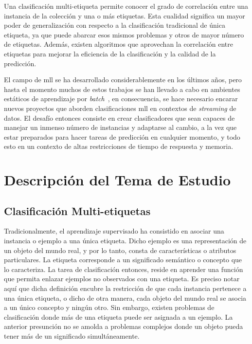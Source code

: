 Una clasificación multi-etiqueta permite conocer el grado de correlación entre
una instancia de la colección y una o más etiquetas. Esta cualidad significa un
mayor poder de generalización con respecto a la clasificación tradicional de
única etiqueta, ya que puede abarcar esos mismos problemas y otros de mayor
número de etiquetas. Además, existen algoritmos que aprovechan la correlación
entre etiquetas para mejorar la eficiencia de la clasificación y la calidad de
la predicción.

El campo de \acrshort{mll} se ha desarrollado considerablemente en los últimos
años, pero hasta el momento muchos de estos trabajos se han llevado a cabo en
ambientes estáticos de aprendizaje por
\textit{batch}~\cite{read_classifier_2011}, en consecuencia, se hace necesario
encarar nuevos proyectos que aborden clasificaciones \acrshort{mll} en contextos
de \textit{streaming} de datos. El desafío entonces consiste en crear
clasificadores que sean capaces de manejar un inmenso número de instancias y
adaptarse al cambio, a la vez que estar preparados para hacer tareas de
predicción en cualquier momento, y todo esto en un contexto de altas
restricciones de tiempo de respuesta y memoria.

\section{Descripción del Tema de Estudio}

\subsection{Clasificación Multi-etiquetas}
\label{intro_mll}

Tradicionalmente, el aprendizaje supervisado ha consistido en asociar una
instancia o ejemplo a una única etiqueta. Dicho ejemplo es una representación de
un objeto del mundo real, y por lo tanto, consta de características o atributos
particulares. La etiqueta corresponde a un significado semántico o concepto que
lo caracteriza. La tarea de clasificación entonces, reside en aprender una
función que permita enlazar ejemplos no observados con una etiqueta. Es preciso
notar aquí que dicha definición encubre la restricción de que cada instancia
pertenece a una única etiqueta, o dicho de otra manera, cada objeto del mundo
real se asocia a un único concepto y ningún otro. Sin embargo, existen problemas
de clasificación donde más de una etiqueta puede ser asignada a un ejemplo. La
anterior presunción no se amolda a problemas complejos donde un objeto pueda
tener más de un significado simultáneamente.

